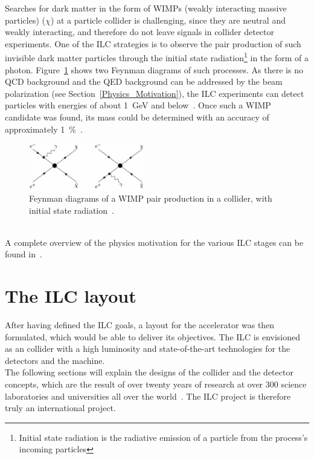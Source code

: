 Searches for dark matter in the form of WIMPs (weakly interacting massive particles) ($\chi$) at a particle collider is challenging, since they are neutral and weakly interacting, and therefore do not leave signals in collider detector experiments.
One of the ILC strategies is to observe the pair production of such invisible dark matter particles through the initial state radiation\footnote{Initial state radiation is the radiative emission of a particle from the process's incoming particles} in the form of a photon.
Figure~\ref{fig:WIMPS} shows two Feynman diagrams of such processes.
As there is no QCD background and the QED background can be addressed by the beam polarization (see Section~\ref{Physics_Motivation}), the ILC experiments can detect particles with energies of about \SI{1}{\GeV} and below~\cite[p. 20]{ILCPhysics}.
Once such a WIMP candidate was found, its mass could be determined with an accuracy of approximately \SI{1}{\percent}~\cite[p. 27]{ILC_Discovery}.
\begin{figure}
\centering
\includegraphics[width=0.45\textwidth]{Figures/WIMP_search.pdf}
\caption[Feynman diagrams of radiative WIMP pair production]{Feynman diagrams of a WIMP pair production in a \positron\electron collider, with initial state radiation~\cite[p. 4]{WIMP}.}
\label{fig:WIMPS}
\end{figure}
\\A complete overview of the physics motivation for the various ILC stages can be found in~\cite{PhysicsCase}.

\section{The ILC layout}
\label{ILC:layout}
After having defined the ILC goals, a layout for the accelerator was then formulated, which would be able to deliver its objectives.
The ILC is envisioned as an \positron\electron collider with a high luminosity and state-of-the-art technologies for the detectors and the machine.
\\The following sections will explain the designs of the collider and the detector concepts, which are the result of over twenty years of research at over 300 science laboratories and universities all over the world~\cite{TDR1}.
The ILC project is therefore truly an international project.

